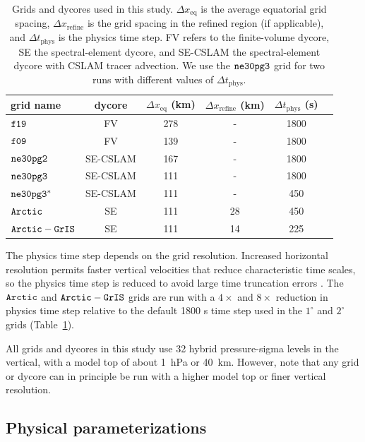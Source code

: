 \documentclass[draft]{agujournal2019}
\begin{document}
 \begin{table}
 \centering
 \scriptsize
 \begin{tabular}{lccccc}
   \hline
   grid name & dycore & $\Delta x_{\mathrm{eq}}$ (km) & $\Delta x_{\mathrm{refine}}$ (km) & $\Delta t_{\mathrm{phys}}$ (s) \\ 
   \hline
   $\tt f19$ & FV & 278 & - &1800 \\
   $\tt f09$ & FV & 139 & - &1800 \\
   $\tt ne30pg2$ & SE-CSLAM & 167 & - & 1800 \\
   $\tt ne30pg3$ & SE-CSLAM & 111 & - & 1800 \\
   $\tt ne30pg3^{*}$ & SE-CSLAM & 111 & - & 450 \\
   $\tt Arctic$ & SE & 111 & 28 & 450 \\
   $\tt Arctic-GrIS$ & SE & 111 & 14 & 225 \\
 \hline
 \end{tabular}
  \caption{Grids and dycores used in this study. $\Delta x_{\mathrm{eq}}$ is the average equatorial grid spacing, $\Delta x_{\mathrm{refine}}$ is the grid spacing in the refined region (if applicable), and $\Delta t_{\mathrm{phys}}$ is the physics time step. FV refers to the finite-volume dycore, SE the spectral-element dycore, and SE-CSLAM the spectral-element dycore with CSLAM tracer advection.  We use the $\tt ne30pg3$ grid for two runs with different values of $\Delta t_{\mathrm{phys}}$.{\color{purple}{Rene - maybe include model cost?}}}
 \label{tbl:table1}
 \end{table}

The physics time step depends on the grid resolution. Increased horizontal resolution permits faster vertical velocities that reduce characteristic time scales, so the physics time step is reduced to avoid large time truncation errors \cite{HR2018JAMES}. The $\tt Arctic$ and $\tt Arctic-GrIS$ grids are run with a $4\times$ and $8\times$ reduction in physics time step relative to the default 1800 s time step used in the $1^{\circ}$ and $2^{\circ}$ grids (Table~\ref{tbl:table1}).

All grids and dycores in this study use 32 hybrid pressure-sigma levels in the vertical, with a model top of about 1~hPa or 40~km. However, note that any grid or dycore can in principle be run with a higher model top or finer vertical resolution.

\subsection{Physical parameterizations}
\end{document}
